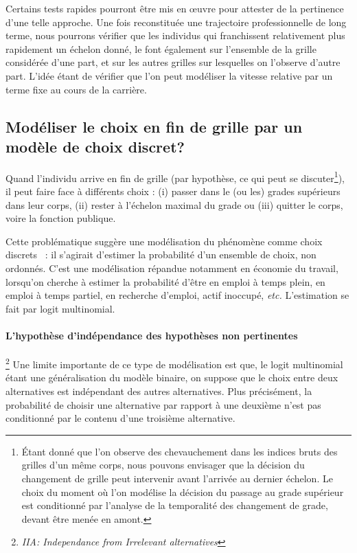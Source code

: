 \documentclass[11pt,a4paper]{article}
\begin{document}
Certains tests rapides pourront être mis en \oe uvre pour attester de la pertinence d'une telle approche. Une fois reconstituée une trajectoire professionnelle de long terme, nous pourrons vérifier que les individus qui franchissent relativement plus rapidement un échelon donné, le font également sur l'ensemble de la grille considérée d'une part, et sur les autres grilles sur lesquelles on l'observe d'autre part. L'idée étant de vérifier que l'on peut modéliser la vitesse relative par un terme fixe au cours de la carrière. 


\subsection{Modéliser le \og choix \fg{} en fin de grille par un modèle de choix discret?}

Quand l'individu arrive en fin de grille (par hypothèse, ce qui peut se discuter\footnote{Étant donné que l'on observe des chevauchement dans les indices bruts des grilles d'un même corps, nous pouvons envisager que la décision du changement de grille peut intervenir avant l'arrivée au dernier échelon. Le choix du moment où l'on modélise la décision du passage au grade supérieur est conditionné par l'analyse de la temporalité des changement de grade, devant être menée en amont. }), il peut faire face à différents \og choix \fg{}: (i) passer dans le (ou les) grades supérieurs dans leur corps, (ii) rester à l'échelon maximal du grade ou (iii) quitter le corps, voire la fonction publique. 

Cette problématique suggère une modélisation du phénomène comme \og choix discrets \fg\ : il s'agirait d'estimer la probabilité d'un ensemble de choix, non ordonnés.
C'est une modélisation répandue notamment en économie du travail, lorsqu'on cherche à estimer la probabilité d'être en emploi à temps plein, en emploi à temps partiel,
en recherche d'emploi, actif inoccupé, \textit{etc.} L'estimation se fait par logit multinomial.



\paragraph{L'hypothèse d'indépendance des hypothèses non pertinentes}\footnote{\textit{IIA: Independance from Irrelevant alternatives}} Une limite importante de ce type de modélisation est que, le logit multinomial étant une généralisation du modèle binaire, on suppose que le choix entre deux alternatives est indépendant des autres alternatives. Plus précisément, la probabilité de choisir une alternative par rapport à une deuxième n'est pas conditionné par le contenu d'une troisième alternative. 
\end{document}
